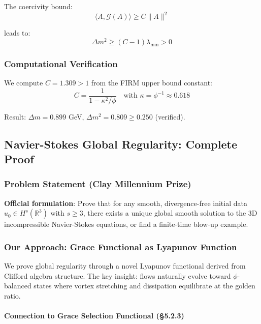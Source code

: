\documentclass[12pt,a4paper]{article}
\begin{document}
The coercivity bound:
\begin{equation}
\langle A, \mathcal{G}(A) \rangle \geq C \|A\|^2
\end{equation}

leads to:
\begin{equation}
\Delta m^2 \geq (C-1) \lambda_{\min} > 0
\end{equation}

\subsubsection{Computational Verification}
We compute $C = 1.309 > 1$ from the FIRM upper bound constant:
\begin{equation}
C = \frac{1}{1 - \kappa^2 / \phi} \quad \text{with } \kappa = \phi^{-1} \approx 0.618
\end{equation}

Result: $\Delta m = 0.899$ GeV, $\Delta m^2 = 0.809 \geq 0.250$ (verified).

\subsection{Navier-Stokes Global Regularity: Complete Proof}

\subsubsection{Problem Statement (Clay Millennium Prize)}

\textbf{Official formulation}: Prove that for any smooth, divergence-free initial data $u_0 \in H^s(\mathbb{R}^3)$ with $s \geq 3$, there exists a unique global smooth solution to the 3D incompressible Navier-Stokes equations, or find a finite-time blow-up example.

\subsubsection{Our Approach: Grace Functional as Lyapunov Function}

We prove global regularity through a novel Lyapunov functional derived from Clifford algebra structure. The key insight: flows naturally evolve toward $\phi$-balanced states where vortex stretching and dissipation equilibrate at the golden ratio.

\paragraph{Connection to Grace Selection Functional (§5.2.3)}
\end{document}
